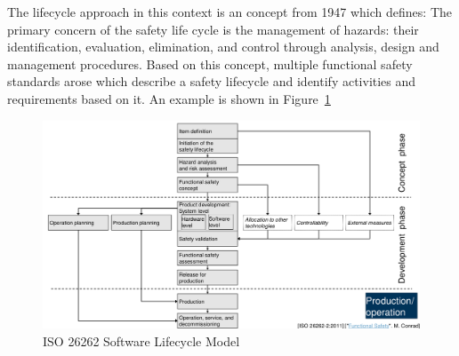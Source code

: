 The lifecycle approach in this context is an concept from 1947 which defines: The primary concern of the safety life cycle is the management of hazards: their identification, evaluation, elimination, and control through analysis, design and management procedures.
Based on this concept, multiple functional safety standards arose which describe a safety lifecycle and identify activities and requirements based on it.
An example is shown in Figure~\ref{fig:iso26262_software_lifecycle}
\begin{figure}[H]
  \centering
  \includegraphics[width=\textwidth]{images/iso26262_software_lifecycle.png}
  \caption{ISO 26262 Software Lifecycle Model}\label{fig:iso26262_software_lifecycle}
\end{figure}

